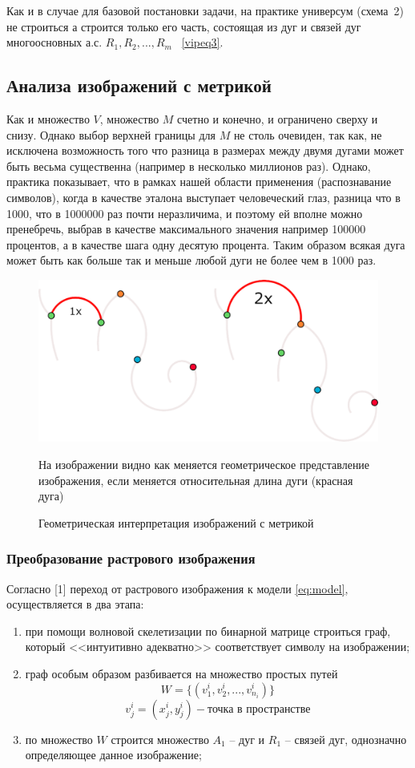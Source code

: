 \begin{remark}
Как и в случае для базовой постановки задачи, на практике универсум (схема~2) не строиться а строится только его часть, состоящая из дуг и связей дуг многоосновных а.с.  $R_1,R_2 , ..., R_m$ ~\ref{vipeq3}.
\end{remark}

\subsection{Анализа изображений с метрикой}

Как и множество $V$, множество $M$ счетно и конечно, и ограничено сверху и снизу. Однако выбор верхней границы для $M$ не столь очевиден, так как, не исключена возможность того что разница в размерах между двумя дугами может быть весьма существенна (например в несколько миллионов раз). Однако, практика показывает, что в рамках нашей области применения (распознавание символов), когда в качестве эталона выступает человеческий глаз, разница что в 1000, что в 1000000 раз почти неразличима, и поэтому ей вполне можно пренебречь, выбрав в качестве максимального значения например 100000 процентов, а в качестве шага одну десятую процента. Таким образом всякая дуга может быть как больше так и меньше любой дуги не более чем в 1000 раз.

\begin{figure}[h]
\centering
\includegraphics[width=0.85\linewidth,keepaspectratio]{images/metrics}
\caption{Геометрическая интерпретация изображений с метрикой}
\medskip
\small
На изображении видно как меняется геометрическое представление изображения, если меняется относительная длина дуги (красная дуга)
\end{figure}

\subsubsection{Преобразование растрового изображения}
Согласно [1] переход от растрового изображения к модели \ref{eq:model}, осуществляется в два этапа:
\begin{enumerate}
\item при помощи волновой скелетизации по бинарной матрице строиться граф, который <<интуитивно адекватно>> соответствует символу на изображении;
\item граф особым образом разбивается на множество простых путей 
$$W = \{ (v_{1}^i, v_{2}^i, ..., v_{n_i}^i) \}$$
$$v_{j}^i = (x_j^i, y_j^i) - \text{точка в пространстве} $$
\item по множество $W$ строится множество $A_1$ -- дуг и $R_1$ -- связей дуг, однозначно определяющее данное изображение;
\end{enumerate}

